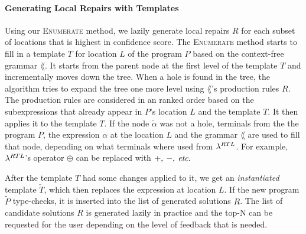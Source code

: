\paragraph{Generating Local Repairs with Templates}
Using our \textsc{Enumerate} method, we lazily generate local repairs $R$ for
each subset of locations that is highest in confidence score. The
\textsc{Enumerate} method starts to fill in a template $T$ for location $L$ of
the program $P$ based on the context-free grammar $\lang$. It starts from the
parent node at the first level of the template $T$ and incrementally moves
down the tree. When a hole is found in the tree, the algorithm tries to expand
the tree one more level using $\lang$'s production rules $R$. The production
rules are considered in an ranked order based on the subexpressions that already
appear in $P$'s location $L$ and the template $T$. It then applies it to the
template $T$. If the node $\tilde{\alpha}$ was not a hole, terminals from the
the program $P$, the expression $\alpha$ at the location $L$ and the grammar
$\lang$ are used to fill that node, depending on what terminals where used from
$\lambda^{RTL}$. For example, $\lambda^{RTL}$'s operator $\oplus$ can be replaced
with $+,\:-,\:\textit{etc.}$

After the template $T$ had some changes applied to it, we get an
\emph{instantiated} template $\tilde{T}$, which then replaces the expression at
location $L$. If the new program $\tilde{P}$ type-checks, it is inserted into
the list of generated solutions $R$. The list of candidate solutions $R$ is
generated lazily in practice and the top-N can be requested for the user
depending on the level of feedback that is needed.



